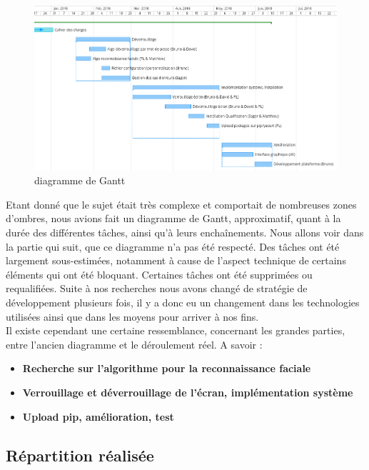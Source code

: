 \documentclass[french]{report}
\begin{document}
\begin{figure}[h]\label{fig:gantt}
  \includegraphics[width=\linewidth]{Gantt}
  \caption{diagramme de Gantt}
  \label{fig:gantt}
\end{figure}

Etant donné que le sujet était très complexe et comportait de nombreuses zones
d'ombres, nous avions fait un diagramme de Gantt, approximatif, quant à la durée
des différentes tâches, ainsi qu'à leurs enchaînements. Nous allons voir dans
la partie qui suit, que ce diagramme n'a pas été respecté. Des tâches ont été
largement sous-estimées, notamment à cause de l'aspect technique de certains
éléments qui ont été bloquant. Certaines tâches ont été supprimées ou requalifiées.
Suite à nos recherches nous avons changé de stratégie de développement plusieurs
fois, il y a donc eu un changement dans les technologies utilisées ainsi que dans les
moyens pour arriver à nos fins.
\\
Il existe cependant une certaine ressemblance, concernant les grandes parties,
entre l'ancien diagramme et le déroulement réel. A savoir :

\vspace{0.5cm}
\begin{itemize}[label=\textbullet, font=\normalfont \color{blue}]
  \item{\textbf{Recherche sur l'algorithme pour la reconnaissance faciale}}
  \item{\textbf{Verrouillage et déverrouillage de l'écran, implémentation système}}
  \item{\textbf{Upload pip, amélioration, test}}
\end{itemize}
\vspace{0.5cm}

\subsection{Répartition réalisée}
\end{document}
